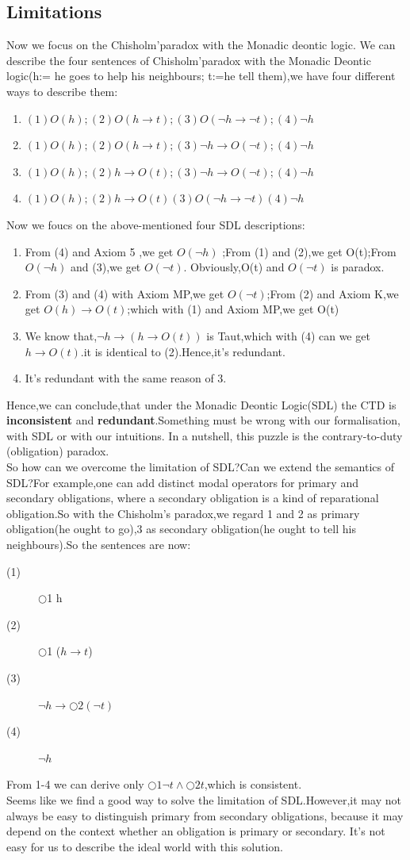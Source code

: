 \documentclass{article}
\begin{document}
\subsection{Limitations}
Now we focus on the Chisholm'paradox with the Monadic deontic logic.
We can describe the four sentences of Chisholm'paradox with the Monadic Deontic logic(h:= he goes to help his neighbours; t:=he tell them),we have four different ways to describe them:
\begin{enumerate}
\item $(1)O(h);(2)O(h\to t);(3)O(\neg h\to \neg t);(4) \neg h$
\item $(1)O(h);(2)O(h \to t);(3) \neg h \to O (\neg t); (4) \neg h$
\item $(1)O(h);(2)h\to O(t);(3)\neg h \to O(\neg t) ;(4)\neg h $
\item $ (1)O(h);(2)h\to O(t)(3)O(\neg h\to \neg t)(4)\neg h$
\end{enumerate}
Now we foucs on the above-mentioned four SDL descriptions:
\begin{enumerate}
\item From (4) and Axiom 5 ,we get $O(\neg h) $ ;From (1) and (2),we get O(t);From $O(\neg h)$ and (3),we get $ O(\neg t)$. Obviously,O(t) and $O(\neg t)$
is paradox.
\item From (3) and (4) with Axiom MP,we get $O(\neg t)$;From (2) and Axiom K,we get $O(h)\to O(t) $;which with (1) and Axiom MP,we get O(t)
\item We know that,$ \neg h \to (h \to O(t))$ is Taut,which with (4) can we get $ h \to O(t)$.it is identical to (2).Hence,it's redundant.
\item It's redundant with the same reason of 3.
\end{enumerate}
Hence,we can conclude,that under the Monadic Deontic Logic(SDL) the CTD is
\textbf{inconsistent} and \textbf{redundant}.Something must be wrong with our formalisation, with SDL or with our intuitions. In a nutshell, this puzzle is the contrary-to-duty
(obligation) paradox.\\

So how can we overcome the limitation of SDL?Can we extend the semantics of SDL?For example,one can add distinct modal operators for primary and secondary obligations, where a secondary obligation is a kind of reparational obligation.So with the Chisholm’s paradox,we regard 1 and 2 as primary obligation(he ought to go),3 as secondary obligation(he ought to tell his neighbours).So the sentences are now:
\begin{description}
\item[(1)] $\bigcirc$1 h
\item[(2)]$\bigcirc$1 ($h \to t $)
\item[(3)]$\neg h \to \bigcirc 2 (\neg t)$
\item[(4)]$\neg h$
\end{description}
From 1-4 we can derive only $\bigcirc 1 \neg t \wedge \bigcirc 2 t$,which is consistent.\\
Seems like we find a good way to solve the limitation of SDL.However,it may not always be easy to distinguish primary from secondary obligations, because it may depend on the context whether an obligation is primary or secondary. It's not easy for us to describe the ideal world with this solution. 
\end{document}
